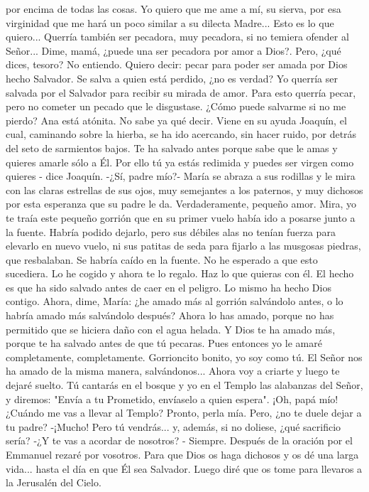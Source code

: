 \documentclass[12pt]{book} %
\begin{document}
por encima de todas las cosas. Yo quiero que me ame a mí, su sierva, por esa virginidad que me hará un poco similar a su dilecta Madre... Esto es lo que quiero... Querría también ser pecadora, muy pecadora, si no temiera ofender al Señor... Dime, mamá, ¿puede una ser pecadora por amor a Dios?. 
Pero, ¿qué dices, tesoro? No entiendo. 
Quiero decir: pecar para poder ser amada por Dios hecho Salvador. Se salva a quien está perdido, ¿no es verdad? Yo 
querría ser salvada por el Salvador para recibir su mirada de amor. Para esto querría pecar, pero no cometer un pecado que le disgustase. ¿Cómo puede salvarme si no me pierdo? 
Ana está atónita. No sabe ya qué decir. 
Viene en su ayuda Joaquín, el cual, caminando sobre la hierba, se ha ido acercando, sin hacer ruido, por detrás del seto 
de sarmientos bajos. 
Te ha salvado antes porque sabe que le amas y quieres amarle sólo a Él. Por ello tú ya estás redimida y puedes ser 
virgen como quieres - dice Joaquín. 
-¿Sí, padre mío?- María se abraza a sus rodillas y le mira con las claras estrellas de sus ojos, muy semejantes a los 
paternos, y muy dichosos por esta esperanza que su padre le da. 
Verdaderamente, pequeño amor. Mira, yo te traía este pequeño gorrión que en su primer vuelo había ido a posarse 
junto a la fuente. Habría podido dejarlo, pero sus débiles alas no tenían fuerza para elevarlo en nuevo vuelo, ni sus patitas de seda para fijarlo a las musgosas piedras, que resbalaban. Se habría caído en la fuente. No he esperado a que esto sucediera. Lo he cogido y ahora te lo regalo. Haz lo que quieras con él. El hecho es que ha sido salvado antes de caer en el peligro. Lo mismo ha hecho Dios contigo. Ahora, dime, María: ¿he amado más al gorrión salvándolo antes, o lo habría amado más salvándolo después? 
Ahora lo has amado, porque no has permitido que se hiciera daño con el agua helada. 
Y Dios te ha amado más, porque te ha salvado antes de que tú pecaras. 
Pues entonces yo le amaré completamente, completamente. Gorrioncito bonito, yo soy como tú. El Señor nos ha amado de la misma manera, salvándonos... Ahora voy a criarte y luego te dejaré suelto. Tú cantarás en el bosque y yo en el Templo las alabanzas del Señor, y diremos: "Envía a tu Prometido, envíaselo a quien espera". ¡Oh, papá mío! ¿Cuándo me vas a llevar al Templo? 
Pronto, perla mía. Pero, ¿no te duele dejar a tu padre? 
-¡Mucho! Pero tú vendrás... y, además, si no doliese, ¿qué sacrificio sería? 
	-¿Y te vas a acordar de nosotros? 	 	 	 	 	 	 	- Siempre. Después de 
la oración por el Emmanuel rezaré por vosotros. Para que Dios os haga dichosos y os dé una larga vida... hasta el día en que Él sea Salvador. Luego diré que os tome para llevaros a la Jerusalén del Cielo.     
\end{document}
